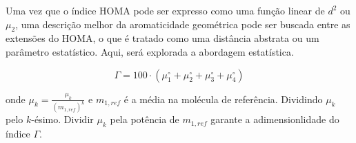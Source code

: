 Uma vez que o índice \gls{HOMA} pode ser expresso como uma função linear de $d^2$ ou $\mu_2$, uma descrição melhor da aromaticidade geométrica pode ser buscada entre as extensões do \gls{HOMA}, o que é tratado como uma distância abstrata ou um parâmetro estatístico. Aqui, será explorada a abordagem estatística.

\begin{equation}
    \Gamma = 100 \cdot (\mu_1^\circ + \mu_2^\circ + \mu_3^\circ + \mu_4^\circ)
\end{equation}

\noindent onde $\mu_k = \displaystyle \frac{\mu_k}{(m_{1, ref})^k}$ e $m_{1, ref}$ é a média na molécula de referência. Dividindo $\mu_k$ pelo $k$-ésimo. Dividir $\mu_k$ pela potência de $m_{1, ref}$ garante a adimensionlidade do índice $\Gamma$.